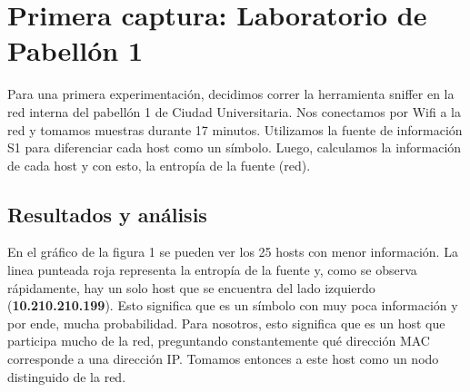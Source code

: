 \section{Primera captura: Laboratorio de Pabellón 1}

\par Para una primera experimentación, decidimos correr la herramienta sniffer en la red interna del pabellón 1 de Ciudad Universitaria. Nos conectamos por Wifi a la red y tomamos muestras durante 17 minutos. Utilizamos la fuente de información S1 para diferenciar cada host como un símbolo. Luego, calculamos la información de cada host y con esto, la entropía de la fuente (red).

\subsection{Resultados y análisis}

\par En el gráfico de la figura 1 se pueden ver los 25 hosts con menor información. La linea punteada roja representa la entropía de la fuente y, como se observa rápidamente, hay un solo host que se encuentra del lado izquierdo (\textbf{10.210.210.199}). Esto significa que es un símbolo con muy poca información y por ende, mucha probabilidad. Para nosotros, esto significa que es un host que participa mucho de la red, preguntando constantemente qué dirección MAC corresponde a una dirección IP. Tomamos entonces a este host como un nodo distinguido de la red.

